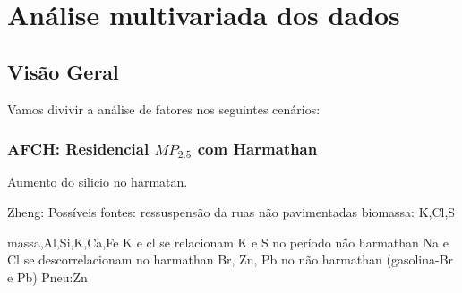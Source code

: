 \chapter{Análise multivariada dos dados}

\section{Visão Geral}
Vamos divivir a análise de fatores nos seguintes cenários:







\subsection{AFCH: Residencial $MP_{2.5}$ \textbf{com} Harmathan}


Aumento do silicio no harmatan.

Zheng: 
Possíveis fontes: ressuspensão da ruas não pavimentadas
biomassa: K,Cl,S

massa,Al,Si,K,Ca,Fe
K e cl se relacionam
K e S no período não harmathan 
Na e Cl se descorrelacionam no harmathan
Br, Zn, Pb no não harmathan (gasolina-Br e Pb) Pneu:Zn



